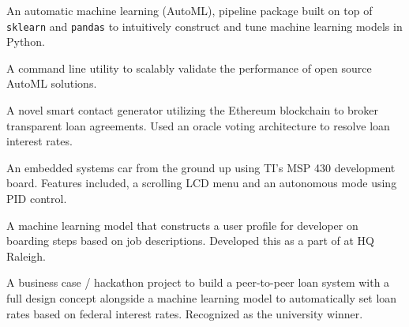 
\newcommand{\eclinic}[1]{\href{https://entrepreneurship.ncsu.edu/spaces/entrepreneurship-clinic/}{#1}}

{%
	An automatic machine learning (AutoML), pipeline package built on top of \texttt{sklearn} and \texttt{pandas} to intuitively construct and tune machine learning models in Python.
}

\vspace{0.5em}

{%
	A command line utility to scalably validate the performance of open source AutoML solutions.
}

\vspace{0.5em}

{%
	A novel smart contact generator utilizing the Ethereum blockchain to broker transparent loan agreements. Used an oracle voting architecture to resolve loan interest rates.
}

\vspace{0.5em}

{%
	An embedded systems car from the ground up using TI's MSP 430 development board. Features included, a scrolling LCD menu and an autonomous mode using PID control.
}

\vspace{0.5em}

{%
	A machine learning model that constructs a user profile for developer on boarding steps based on job descriptions. Developed this as a part of  at HQ Raleigh.
}

\vspace{0.5em}

{%
	A business case / hackathon project to build a peer-to-peer loan system with a full design concept alongside a machine learning model to automatically set loan rates based on federal interest rates. Recognized as the university winner.
}

\vspace{0.5em}

